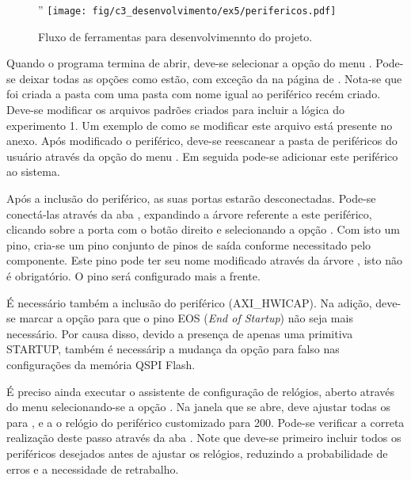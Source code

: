 \documentclass[11pt,a4paper,oneside]{book}
\begin{document}
\begin{figure}[htp]
\centering''
\texttt{[image: fig/c3\_desenvolvimento/ex5/perifericos.pdf]}
\caption{Fluxo de ferramentas para desenvolvimennto do projeto.}
\label{fig:ex5:perifericos}
\end{figure}

Quando o programa termina de abrir, deve-se selecionar a opção  do menu .
Pode-se deixar todas as opções como estão, com exceção da  na página de .
Nota-se que foi criada a pasta  com uma pasta com nome igual ao periférico recém criado.
Deve-se modificar os arquivos padrões criados para incluir a lógica do experimento 1.
Um exemplo de como se modificar este arquivo está presente no anexo.
Após modificado o periférico, deve-se reescanear a pasta de periféricos do usuário através da opção  do menu .
Em seguida pode-se adicionar este periférico ao sistema.

Após a inclusão do periférico, as suas portas estarão desconectadas.
Pode-se conectá-las através da aba , expandindo a árvore referente a este periférico, clicando sobre a porta  com o botão direito e selecionando a opção .
Com isto um pino, cria-se um pino conjunto de pinos de saída conforme necessitado pelo componente.
Este pino pode ter seu nome modificado através da árvore , isto não é obrigatório.
O pino  será configurado mais a frente.

É necessário também a inclusão do periférico  (AXI\_\-HW\-ICAP).
Na adição, deve-se marcar a opção  para que o pino EOS (\textit{End of Startup}) não seja mais necessário.
Por causa disso, devido a presença de apenas uma primitiva STARTUP, também é necessárip a mudança da opção  para falso nas configurações da memória QSPI Flash.

É preciso ainda executar o assistente de configuração de relógios, aberto através do menu  selecionando-se a opção .
Na janela que se abre, deve ajustar todas os  para , e a o relógio do periférico customizado  para 200.
Pode-se verificar a correta realização deste passo através da aba .
Note que deve-se primeiro incluir todos os periféricos desejados antes de ajustar os relógios, reduzindo a probabilidade de erros e a necessidade de retrabalho.
\end{document}
